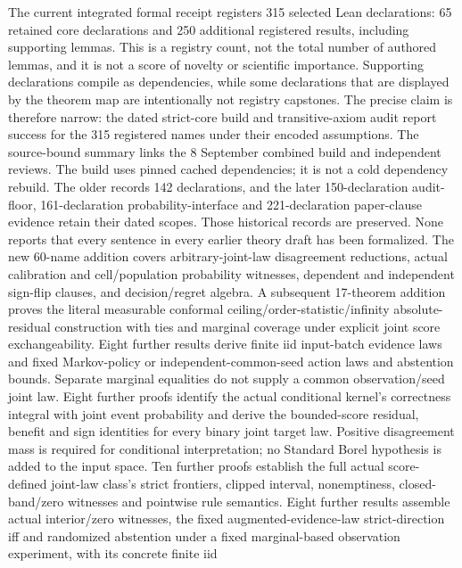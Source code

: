 The current integrated formal receipt registers 315 selected Lean declarations: 65 retained core
declarations and 250 additional registered results, including supporting lemmas.  This is a
registry count, not the total number of authored lemmas, and it is not a score of novelty or
scientific importance.  Supporting declarations compile as dependencies, while some declarations
that are displayed by the theorem map are intentionally not registry capstones.  The precise
claim is therefore narrow: the dated strict-core build and transitive-axiom audit report success
for the 315 registered names under their encoded assumptions. The source-bound summary
 links the
8 September combined build and independent reviews. The build uses pinned cached
dependencies; it is not a cold dependency rebuild. The older
 records 142 declarations, and the later
150-declaration audit-floor, 161-declaration probability-interface and 221-declaration paper-clause evidence retain their dated scopes.  Those historical records are
preserved.  None reports that every sentence in every earlier theory draft has been formalized.
The new 60-name addition covers arbitrary-joint-law disagreement reductions, actual calibration
and cell/population probability witnesses, dependent and independent sign-flip clauses, and
decision/regret algebra. A subsequent 17-theorem addition proves the literal measurable conformal
ceiling/order-statistic/infinity absolute-residual construction with ties and marginal coverage
under explicit joint score exchangeability. Eight further results derive finite iid input-batch
evidence laws and fixed Markov-policy or independent-common-seed action laws and abstention bounds.
Separate marginal equalities do not supply a common observation/seed joint law.
Eight further proofs identify the actual conditional kernel's correctness integral with joint
event probability and derive the bounded-score residual, benefit and sign identities for every
binary joint target law. Positive disagreement mass is required for conditional interpretation;
no Standard Borel hypothesis is added to the input space. Ten further proofs establish the full
actual score-defined joint-law class's strict frontiers, clipped interval, nonemptiness,
closed-band/zero witnesses and pointwise rule semantics. Eight further results assemble actual
interior/zero witnesses, the fixed augmented-evidence-law strict-direction iff and randomized
abstention under a fixed marginal-based observation experiment, with its concrete finite iid

